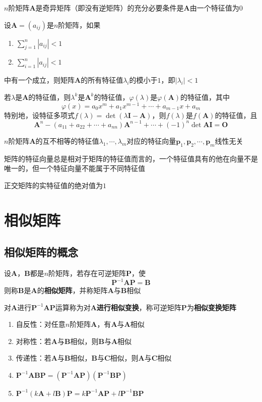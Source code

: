 \documentclass[UTF8]{ctexart}
\newcommand{\ve}[1]{{\bm{#1}}}
\newcommand{\mat}[1]{\ve{#1}}
\newcommand{\abs}[1]{{\left|{#1}\right|}}
\newcommand{\emplin}{\vspace{1em}}
\begin{document}
$n$阶矩阵$\mat{A}$是奇异矩阵（即没有逆矩阵）的充分必要条件是$\mat{A}$由一个特征值为$0$

\emplin
\emplin

设$\mat{A}=(a_{ij})$是$n$阶矩阵，如果
\begin{enumerate}
  \item $\displaystyle\sum_{j=1}^n\abs{a_{ij}}<1$
  \item $\displaystyle\sum_{i=1}^n\abs{a_{ij}}<1$
\end{enumerate}
中有一个成立，则矩阵$\mat{A}$的所有特征值$\lambda_i$的模小于$1$，即$\abs{\lambda_i}<1$

\emplin

若$\lambda$是$\mat{A}$的特征值，则$\lambda^k$是$\mat{A}^k$的特征值，$\varphi(\lambda)$是$\varphi(\mat{A})$的特征值，其中
\[\varphi(x)=a_0x^m+a_1x^{m-1}+\cdots+a_{m-1}x+a_m\]
特别地，设特征多项式$f(\lambda)=\det(\lambda\mat{I}-\mat{A})$，则$f(\lambda)$是$f(\mat{A})$的特征值，且
\[\mat{A}^n-(a_{11}+a_{22}+\cdots+a_{nn})\mat{A}^{n-1}+\cdots+(-1)^n\det\mat{A}\mat{I}=\mat{O}\]

\emplin
\emplin
\emplin

$n$阶矩阵$\mat{A}$的互不相等的特征值$\lambda_1,\cdots,\lambda_m$对应的特征向量$\mat{p}_1,\mat{p}_2,\cdots,\mat{p}_m$线性无关

\emplin

矩阵的特征向量总是相对于矩阵的特征值而言的，一个特征值具有的他在向量不是唯一的，但一个特征向量不能属于不同特征值

\emplin

正交矩阵的实特征值的绝对值为$1$

\section*{相似矩阵}
\subsection*{相似矩阵的概念}
设$\mat{A}$，$\mat{B}$都是$n$阶矩阵，若存在可逆矩阵$\mat{P}$，使
\[\mat{P}^{-1}\mat{A}\mat{P}=\mat{B}\]
则称$\mat{B}$是$\mat{A}$的\textbf{相似矩阵}，并称矩阵$\mat{A}$与$\mat{B}$相似

对$\mat{A}$进行$\mat{P}^{-1}\mat{A}\mat{P}$运算称为对$\mat{A}$\textbf{进行相似变换}，称可逆矩阵$\mat{P}$为\textbf{相似变换矩阵}

\emplin

\begin{enumerate}
  \item 自反性：对任意$n$阶矩阵$\mat{A}$，有$\mat{A}$与$\mat{A}$相似
  \item 对称性：若$\mat{A}$与$\mat{B}$相似，则$\mat{B}$与$\mat{A}$相似
  \item 传递性：若$\mat{A}$与$\mat{B}$相似，$\mat{B}$与$\mat{C}$相似，则$\mat{A}$与$\mat{C}$相似
  \item $\mat{P}^{-1}\mat{A}\mat{B}\mat{P}=(\mat{P}^{-1}\mat{A}\mat{P})(\mat{P}^{-1}\mat{B}\mat{P})$
  \item $\mat{P}^{-1}(k\mat{A}+l\mat{B})\mat{P}=k\mat{P}^{-1}\mat{A}\mat{P}+l\mat{P}^{-1}\mat{B}\mat{P}$
\end{enumerate}
\end{document}
